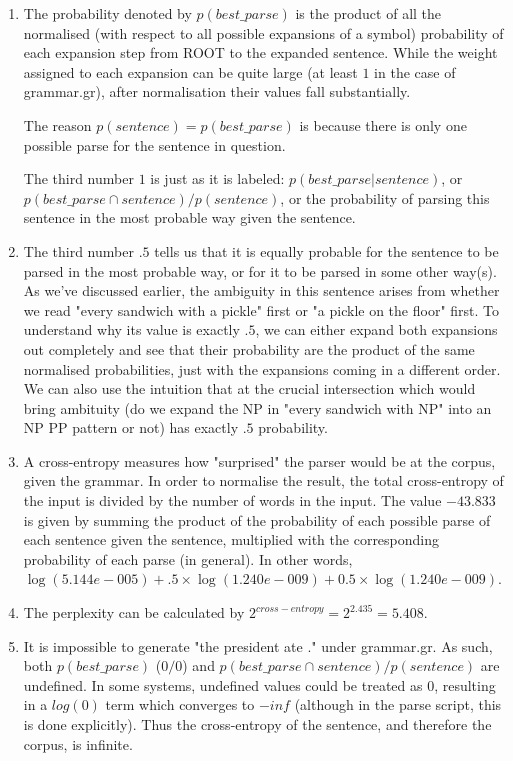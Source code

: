 \documentclass[11pt]{article}
\begin{document}
\begin{enumerate}
      \item The probability denoted by $p(best\_parse)$ is the product of all the normalised (with respect to all possible expansions of a symbol) probability of each expansion step from ROOT to the expanded sentence. While the weight assigned to each expansion can be quite large (at least $1$ in the case of grammar.gr), after normalisation their values fall substantially. 
      
      The reason $p(sentence) = p(best\_parse)$ is because there is only one possible parse for the sentence in question.

      The third number $1$ is just as it is labeled: $p(best\_parse | sentence)$, or $p(best\_parse \cap sentence) / p(sentence)$, or the probability of parsing this sentence in the most probable way given the sentence.

      \item The third number $.5$ tells us that it is equally probable for the sentence to be parsed in the most probable way, or for it to be parsed in some other way(s). As we've discussed earlier, the ambiguity in this sentence arises from whether we read "every sandwich with a pickle" first or "a pickle on the floor" first. To understand why its value is exactly $.5$, we can either expand both expansions out completely and see that their probability are the product of the same normalised probabilities, just with the expansions coming in a different order. We can also use the intuition that at the crucial intersection which would bring ambituity (do we expand the NP in "every sandwich with NP" into an NP PP pattern or not) has exactly $.5$ probability.
      
      \item A cross-entropy measures how "surprised" the parser would be at the corpus, given the grammar. In order to normalise the result, the total cross-entropy of the input is divided by the number of words in the input. The value $-43.833$ is given by summing the product of the probability of each possible parse of each sentence given the sentence, multiplied with the corresponding probability of each parse (in general). In other words, $\log(5.144e-005) + .5 \times \log(1.240e-009) + 0.5 \times \log(1.240e-009)$.
      
      \item The perplexity can be calculated by $2^{cross-entropy} = 2^{2.435} = 5.408$.
      
      \item It is impossible to generate "the president ate ." under grammar.gr. As such, both $p(best\_parse)$ ($0/0$) and $p(best\_parse \cap sentence) / p(sentence)$ are undefined. In some systems, undefined values could be treated as $0$, resulting in a $log(0)$ term which converges to $-inf$ (although in the parse script, this is done explicitly). Thus the cross-entropy of the sentence, and therefore the corpus, is infinite.
\end{enumerate}
\end{document}
